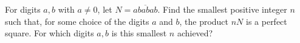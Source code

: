 For digits $a,b$ with $a\ne0$, let $N=\overline{ababab}$. Find the smallest positive integer $n$ such that, for some choice of the digits $a$ and $b$, the product $nN$ is a perfect square. For which digits $a,b$ is this smallest $n$ achieved?
